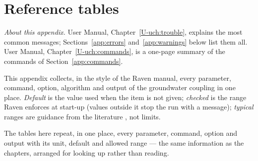 \chapter{Reference tables}\label{app:tables}
\noindent\emph{About this appendix.} User Manual, Chapter~\ref{U-uch:trouble}, explains the most common
messages; Sections~\ref{app:errors} and~\ref{app:warnings} below list them all. User Manual,
Chapter~\ref{U-uch:commands}, is a one-page summary of the commands of Section~\ref{app:commands}.

This appendix collects, in the style of the Raven manual, every parameter, command, option, algorithm and output of the
groundwater coupling in one place. \emph{Default} is the value used when the item is not given; \emph{checked} is the range
Raven enforces at start-up (values outside it stop the run with a message); \emph{typical} ranges are guidance from the
literature \cite{freeze1979groundwater,domenico1998physical,johnson1967specific,calver2001riverbed}, not limits.

\begin{plain}
The tables here repeat, in one place, every parameter, command, option and output with its unit, default and allowed range
--- the same information as the chapters, arranged for looking up rather than reading.
\end{plain}

